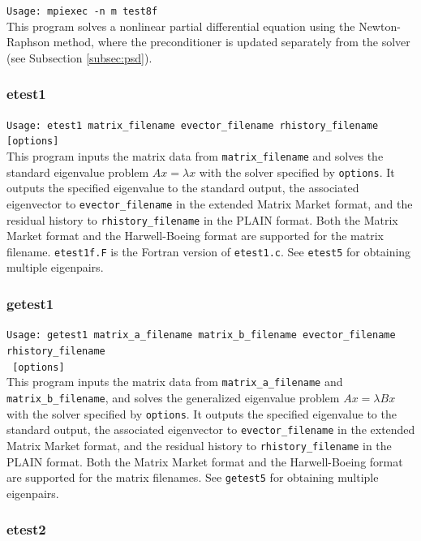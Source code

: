 \documentclass[a4paper]{article}
\begin{document}
\verb+Usage: mpiexec -n m test8f+\\

This program solves a nonlinear partial differential equation
using the Newton-Raphson method, where the preconditioner is
updated separately from the solver (see Subsection \ref{subsec:psd}).

\subsubsection{etest1}

\verb+Usage: etest1 matrix_filename evector_filename rhistory_filename [options]+\\

This program inputs the matrix data from {\tt matrix\_filename} and
solves the standard eigenvalue problem $Ax=\lambda x$ with 
the solver specified by {\tt options}. 
It outputs the specified eigenvalue to the standard output, 
the associated eigenvector to {\tt evector\_filename} 
in the extended Matrix Market format, and 
the residual history to {\tt rhistory\_filename} 
in the PLAIN format.
Both the Matrix Market format and the Harwell-Boeing format are
supported for the matrix filename. 
{\tt etest1f.F} is the Fortran version of {\tt etest1.c}.
See {\tt etest5} for obtaining multiple eigenpairs.

\subsubsection{getest1}

\verb+Usage: getest1 matrix_a_filename matrix_b_filename evector_filename rhistory_filename +\\
\verb+ [options]+\\

This program inputs the matrix data from {\tt matrix\_a\_filename}
and {\tt matrix\_b\_filename}, and
solves the generalized eigenvalue problem $Ax=\lambda Bx$ with 
the solver specified by {\tt options}. 
It outputs the specified eigenvalue to the standard output, 
the associated eigenvector to {\tt evector\_filename} 
in the extended Matrix Market format, and 
the residual history to {\tt rhistory\_filename} 
in the PLAIN format.
Both the Matrix Market format and the Harwell-Boeing format are
supported for the matrix filenames. 
See {\tt getest5} for obtaining multiple eigenpairs.

\subsubsection{etest2}
\end{document}
